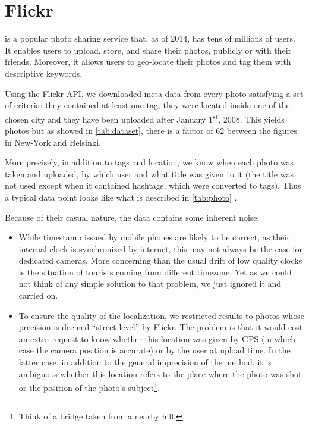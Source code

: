 \section{Flickr}
\label{sec:flickr}

\flickr{} is a popular photo sharing service that, as of 2014, has tens of
millions of users. It enables users to upload, store, and share their photos,
publicly or with their friends. Moreover, it allows users to geo-locate their
photos and tag them with descriptive keywords. 

Using the Flickr API, we downloaded meta-data from every photo satisfying a set
of criteria: they contained at least one tag, they were located inside one of
the chosen city and they have been uploaded after January
1\textsuperscript{st}, 2008. This yields  photos but as
showed in \autoref{tab:dataset}, there is a factor of 62 between the figures in
New-York and Helsinki.

More precisely, in addition to tags and location, we know when each photo was
taken and uploaded, by which user and what title was given to it (the title
was not used except when it contained hashtags, which were converted to tags).
Thus a typical data point looks like what is described in \autoref{tab:photo}
\pageref{tab:photo}.

Because of their casual nature, the data contains some inherent noise:
\begin{itemize}
	\item While timestamp issued by mobile phones are likely to be correct,
 as their internal clock is synchronized by internet, this may not
 always be the case for dedicated cameras. More concerning than the usual
 drift of low quality clocks is the situation of tourists coming from
 different timezone. Yet as we could not think of any simple solution to
 that problem, we just ignored it and carried on.
	\item To ensure the quality of the localization, we restricted results to
 photos whose precision is deemed \enquote{street level} by Flickr. The
 problem is that it would cost an extra request to know
 whether this location was given by GPS (in which case the camera
 position is accurate) or by the user at upload time. In the latter
 case, in addition to the general imprecision of the method, it is
 ambiguous whether this location refers to the place where the photo was
 shot or the position of the photo's subject\footnote{Think of a bridge
 taken from a nearby hill.}.
\end{itemize}
